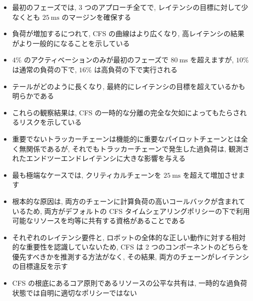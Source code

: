 \begin{frame}{}
    \begin{itemize}
        \item 最初のフェーズでは, 3 つのアプローチ全てで, レイテンシの目標に対して少なくとも $25 \mathrm{~ms}$ のマージンを確保する
\item 負荷が増加するにつれて, CFS の曲線はより広くなり, 高レイテンシの結果がより一般的になることを示している
\item $4 \%$ のアクティベーションのみが最初のフェーズで $80 \mathrm{~ms}$ を超えますが, $10 \%$ は通常の負荷の下で, $16 \%$ は高負荷の下で実行される
\item テールがどのように長くなり, 最終的にレイテンシの目標を超えているかも明らかである
    \end{itemize}
\end{frame}

\begin{frame}{}
    \begin{itemize}
        \item これらの観察結果は, CFS の一時的な分離の完全な欠如によってもたらされるリスクを示している
\item 重要でないトラッカーチェーンは機能的に重要なパイロットチェーンとは全く無関係であるが, それでもトラッカーチェーンで発生した過負荷は, 観測されたエンドツーエンドレイテンシに大きな影響を与える
\item 最も極端なケースでは, クリティカルチェーンを $25 \mathrm{~ms}$ を超えて増加させます
    \end{itemize}
\end{frame}

\begin{frame}{}
    \begin{itemize}
        \item 根本的な原因は, 両方のチェーンに計算負荷の高いコールバックが含まれているため, 両方がデフォルトの CFS タイムシェアリングポリシーの下で利用可能なリソースを均等に共有する資格があることである
\item それぞれのレイテンシ要件と, ロボットの全体的な正しい動作に対する相対的な重要性を認識していないため, CFS は 2 つのコンポーネントのどちらを優先すべきかを推測する方法がなく, その結果, 両方のチェーンがレイテンシの目標違反を示す
\item CFS の根底にあるコア原則であるリソースの公平な共有は, 一時的な過負荷状態では自明に適切なポリシーではない
    \end{itemize}
\end{frame}

